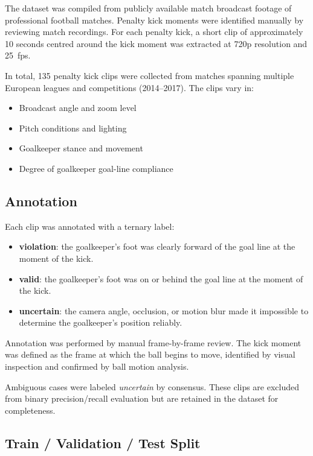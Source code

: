 \documentclass[12pt,a4paper,twoside]{article}
\begin{document}
The dataset was compiled from publicly available match broadcast footage of
professional football matches. Penalty kick moments were identified manually
by reviewing match recordings. For each penalty kick, a short clip of
approximately 10 seconds centred around the kick moment was extracted at 720p
resolution and 25~fps.

In total, 135 penalty kick clips were collected from matches spanning multiple
European leagues and competitions (2014--2017). The clips vary in:
\begin{itemize}
  \item Broadcast angle and zoom level
  \item Pitch conditions and lighting
  \item Goalkeeper stance and movement
  \item Degree of goalkeeper goal-line compliance
\end{itemize}

\subsection{Annotation}

Each clip was annotated with a ternary label:
\begin{itemize}
  \item \textbf{violation}: the goalkeeper's foot was clearly forward of the
        goal line at the moment of the kick.
  \item \textbf{valid}: the goalkeeper's foot was on or behind the goal line
        at the moment of the kick.
  \item \textbf{uncertain}: the camera angle, occlusion, or motion blur made
        it impossible to determine the goalkeeper's position reliably.
\end{itemize}

Annotation was performed by manual frame-by-frame review. The kick moment
was defined as the frame at which the ball begins to move, identified by visual
inspection and confirmed by ball motion analysis.

Ambiguous cases were labeled \textit{uncertain} by consensus. These clips are
excluded from binary precision/recall evaluation but are retained in the dataset
for completeness.

\subsection{Train / Validation / Test Split}
\end{document}
